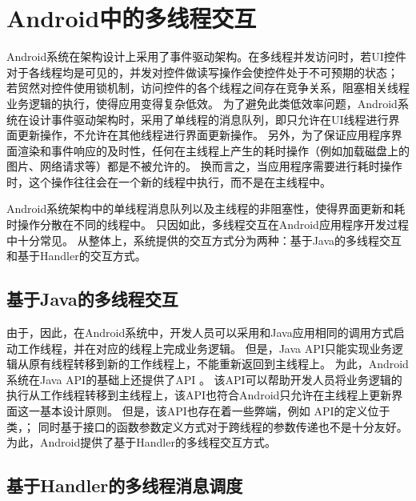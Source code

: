 

\section{Android中的多线程交互}
Android系统在架构设计上采用了事件驱动架构。在多线程并发访问时，若UI控件对于各线程均是可见的，并发对控件做读写操作会使控件处于不可预期的状态；
若贸然对控件使用锁机制，访问控件的各个线程之间存在竞争关系，阻塞相关线程业务逻辑的执行，使得应用变得复杂低效。
为了避免此类低效率问题，Android系统在设计事件驱动架构时，采用了单线程的消息队列，即只允许在UI线程进行界面更新操作，不允许在其他线程进行界面更新操作。
另外，为了保证应用程序界面渲染和事件响应的及时性，任何在主线程上产生的耗时操作（例如加载磁盘上的图片、网络请求等）都是不被允许的。
换而言之，当应用程序需要进行耗时操作时，这个操作往往会在一个新的线程中执行，而不是在主线程中。


Android系统架构中的单线程消息队列以及主线程的非阻塞性，使得界面更新和耗时操作分散在不同的线程中。
只因如此，多线程交互在Android应用程序开发过程中十分常见。
从整体上，系统提供的交互方式分为两种：基于Java的多线程交互和基于Handler的交互方式。%

\subsection{基于Java的多线程交互}

由于，因此，在Android系统中，开发人员可以采用和Java应用相同的调用方式启动工作线程，并在对应的线程上完成业务逻辑。
但是，Java API只能实现业务逻辑从原有线程转移到新的工作线程上，不能重新返回到主线程上。
为此，Android系统在Java API的基础上还提供了API 。
该API可以帮助开发人员将业务逻辑的执行从工作线程转移到主线程上，该API也符合Android只允许在主线程上更新界面这一基本设计原则。
但是，该API也存在着一些弊端，例如 API的定义位于类，；
同时基于接口的函数参数定义方式对于跨线程的参数传递也不是十分友好。
为此，Android提供了基于Handler的多线程交互方式。

\subsection{基于Handler的多线程消息调度}

